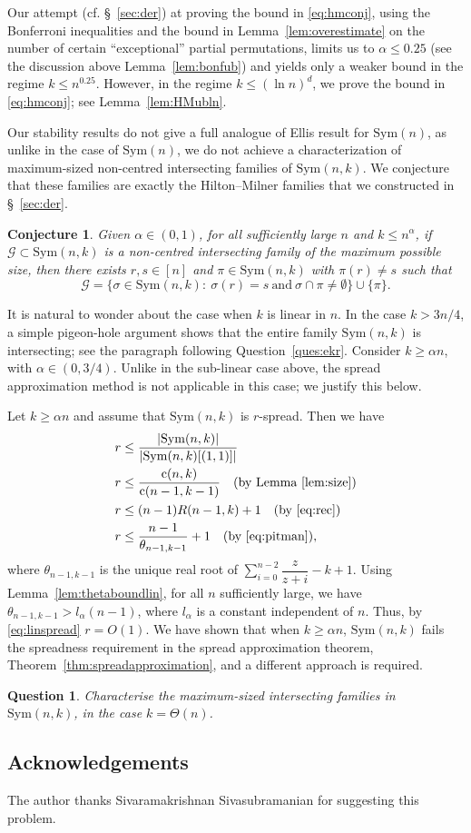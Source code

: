\documentclass{amsart}
\newtheorem{ques}[thm]{Question}
\newtheorem{conj}[thm]{Conjecture}
\newcommand{\mcal}{\mathcal}
\newcommand{\sym}{\mathrm{Sym}}
\newcommand{\st}{\mathrm{c}}
\begin{document}
Our attempt (cf. \S~\ref{sec:der}) at proving the bound in \eqref{eq:hmconj}, using the Bonferroni inequalities and the bound in Lemma~\ref{lem:overestimate} on the number of certain ``exceptional'' partial permutations, limits us to $\alpha \leq 0.25$ (see the discussion above Lemma~\ref{lem:bonfub}) and yields only a weaker bound in the regime $k\leq n^{0.25}$. However, in the regime $k\leq (\ln n)^{d}$, we prove the bound in \eqref{eq:hmconj}; see Lemma~\ref{lem:HMubln}.

Our stability results do not give a full analogue of Ellis \cite{Ellisstability} result for $\sym(n)$, as unlike in the case of $\sym(n)$, we do not achieve a characterization of maximum-sized non-centred intersecting families of $\sym(n,k)$. We conjecture that these families are exactly the Hilton--Milner families that we constructed in \S~\ref{sec:der}. 

\begin{conj}
Given $\alpha \in (0,1)$, for all sufficiently large $n$ and $k\leq n^{\alpha}$, if $\mcal{G} \subset \sym(n,k)$ is a non-centred intersecting family of the maximum possible size, then there exists $r,s\in [n]$ and $\pi \in \sym(n,k)$ with $\pi(r)\neq s$ such that
\[\mcal{G}=\{\sigma \in \sym(n,k)\colon \ \sigma(r)=s\ \text{and}\ \sigma \cap \pi\neq \emptyset\} \cup \{\pi\}.\]
\end{conj} 

It is natural to wonder about the case when $k$ is linear in $n$. In the case $k>3n/4$, a simple pigeon-hole argument shows that the entire family $\sym(n,k)$ is intersecting; see the paragraph following Question~\ref{ques:ekr}. Consider $k\geq \alpha n$, with $\alpha\in (0,3/4)$. Unlike in the sub-linear case above, the spread approximation method is not applicable in this case; we justify this below.

Let $k\geq \alpha n$ and assume that $\sym(n,k)$ is $r$-spread. Then we have 
\begin{align}\label{eq:linspread}
r &\leq \dfrac{|\sym(n,k)|}{|\sym(n,k)[(1,1)]|} \notag\\
r &\leq \dfrac{\st(n,k)}{\st(n-1,k-1)}\quad (\text{by Lemma~\ref{lem:size}})\notag \\
r &\leq (n-1)R(n-1,k)+1\quad (\text{by \eqref{eq:rec}}) \notag \\
r &\leq \dfrac{n-1}{\theta_{n-1,k-1}}+1\quad (\text{by \eqref{eq:pitman}}),
\end{align}   
where $\theta_{n-1,k-1}$ is the unique real root of $\sum\limits_{i=0}^{n-2} \dfrac{z}{z+i}-k+1$. Using Lemma~\ref{lem:thetaboundlin}, for all $n$ sufficiently large, we have $\theta_{n-1,k-1}>l_{\alpha}(n-1)$, where $l_{\alpha}$ is a constant independent of $n$.
Thus, by \eqref{eq:linspread} $r=O(1)$. We have shown that when $k\geq \alpha n$, $\sym(n,k)$ fails the spreadness requirement in the spread approximation theorem, Theorem~\ref{thm:spreadapproximation}, and a different approach is required. 
\begin{ques}
Characterise the maximum-sized intersecting families in $\sym(n,k)$, in the case $k=\Theta(n)$.
\end{ques}
\subsection*{Acknowledgements} The author thanks Sivaramakrishnan Sivasubramanian for suggesting this problem.


\end{document}
